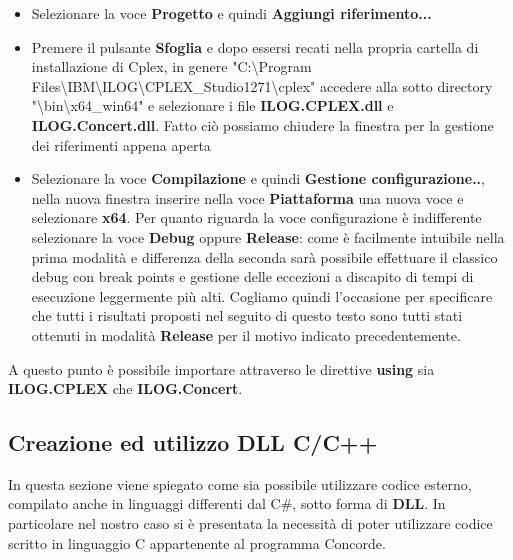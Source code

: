 \documentclass[11pt]{article}
\begin{document}
\begin{flushleft}
    
    \begin{itemize}
        
        \item Selezionare la voce \textbf{Progetto} e quindi \textbf{Aggiungi riferimento...}
        
        \item Premere il pulsante \textbf{Sfoglia} e dopo essersi recati nella propria cartella di installazione di Cplex, in genere "C:\textbackslash Program Files\textbackslash IBM\textbackslash ILOG\textbackslash CPLEX\_Studio1271\textbackslash cplex" accedere alla sotto directory "\textbackslash bin\textbackslash x64\_win64" e selezionare i file \textbf{ILOG.CPLEX.dll} e \textbf{ILOG.Concert.dll}. Fatto ciò possiamo chiudere la finestra per la gestione dei riferimenti appena aperta
        
        \item Selezionare la voce \textbf{Compilazione} e quindi \textbf{Gestione configurazione..}, nella nuova finestra inserire nella voce  \textbf{Piattaforma} una nuova voce e selezionare \textbf{x64}. Per quanto riguarda la voce configurazione è indifferente selezionare la voce \textbf{Debug} oppure \textbf{Release}: come è facilmente intuibile nella prima modalità e differenza della seconda sarà possibile effettuare il classico debug con break points e gestione delle eccezioni a discapito di tempi di esecuzione leggermente più alti. Cogliamo quindi l'occasione per specificare che tutti i risultati proposti nel seguito di questo testo sono tutti stati ottenuti in modalità \textbf{Release} per il motivo indicato precedentemente.
        
    \end{itemize}
    
    
\end{flushleft}

A questo punto è possibile importare attraverso le direttive \textbf{using} sia \textbf{ILOG.CPLEX} che \textbf{ILOG.Concert}.

\subsection*{Creazione ed utilizzo DLL C/C++ }

In questa sezione viene spiegato come sia possibile utilizzare codice esterno, compilato anche in linguaggi differenti dal C\#, sotto forma di \textbf{DLL}. In particolare nel nostro caso si è presentata la necessità di poter utilizzare codice scritto in linguaggio C appartenente al programma Concorde.
\end{document}
